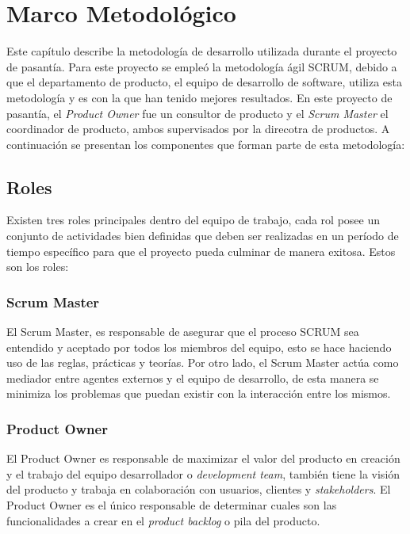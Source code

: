 \chapter{Marco Metodológico} \label{chap:Marco Metodologico}

\vspace{5 mm}

		Este capítulo describe la metodología de desarrollo utilizada durante el proyecto de pasantía. Para este proyecto se empleó la metodología ágil SCRUM, debido a que el departamento de producto, el equipo de desarrollo de software, utiliza esta metodología y es con la que han tenido mejores resultados.\cite{SCRUM} 
\newline
\newline
\indent En este proyecto de pasantía, el \textit{Product Owner} fue un consultor de producto y el \textit{Scrum Master} el coordinador de producto, ambos supervisados por la direcotra de productos. A continuación se presentan los componentes que forman parte de esta metodología:
		
\section{Roles} \label{sect:Roles}
 Existen tres roles principales dentro del equipo de trabajo, cada rol posee un conjunto de actividades bien definidas que deben ser realizadas en un período de tiempo específico para que el proyecto pueda culminar de manera exitosa. Estos son los roles:
 
\subsection{Scrum Master} \label{sect:Scrum Master}
El Scrum Master, es responsable de asegurar que el proceso SCRUM sea entendido y aceptado por todos los miembros del equipo, esto se hace haciendo uso de las reglas, prácticas y teorías. Por otro lado, el Scrum Master actúa como mediador entre agentes externos y el equipo de desarrollo, de esta manera se minimiza los problemas que puedan existir con la interacción entre los mismos.\cite{SCRUM}
  
\subsection{Product Owner} \label{sect:Product Owner}
El Product Owner es responsable de maximizar el valor del producto en creación y el trabajo del equipo desarrollador o \textit{development team}, también tiene la visión del producto y trabaja en colaboración con usuarios, clientes y \textit{stakeholders}. El Product Owner es el único responsable de determinar cuales son las funcionalidades a crear en el \textit{product backlog} o pila del producto.\cite{SCRUM}


